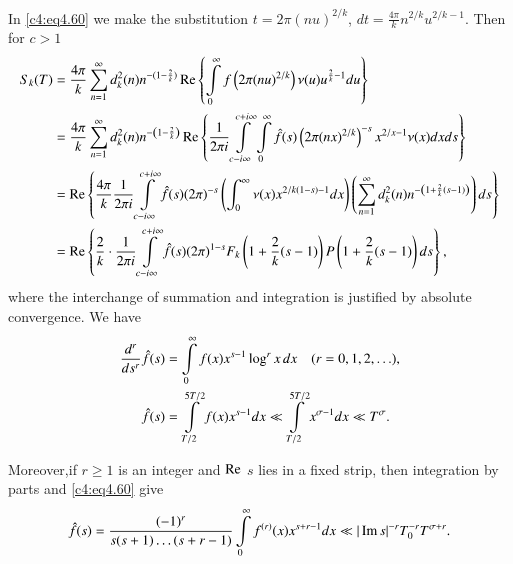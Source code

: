 In \eqref{c4:eq4.60} we make the substitution $t= 2 \pi (nu)^{2/k}$,
$dt = \frac{4\pi}{k} n ^{2/k}u^{2/k-1}$. Then for $c> 1$
{\fontsize{8}{10}\selectfont
\begin{align}
  S_k (T) & = \frac{4 \pi}{k} \sum_{n=1}^\infty d_k^2 (n) n^{- (1-
    \frac{2}{k})} \operatorname{Re} \left\{\int\limits_0^\infty f\left(2 \pi
  (nu)^{2/k}\right)\nu (u) u^{\frac{2}{k}-1} du \right\}\label{c4:eq4.62}\\
  & = \frac{4 \pi}{k} \sum_{n=1}^\infty d_k^2 (n) n^{- \left(1-
    \frac{2}{k}\right)} \operatorname{Re} \left\{\frac{1}{2 \pi i} \int\limits_{c- i
  \infty}^{c+ i \infty} \int\limits_0^\infty  \hat{f} (s) \left(2
  \pi(nx)^{2/k} \right)^{-s}  x^{2/x-1} \nu (x) dx ds\right\}\notag\\
  & = \operatorname{Re} \left\{\frac{4 \pi}{k} \frac{1}{2 \pi i} \int\limits_{c- i
    \infty}^{c+ i \infty} \hat{f} (s) (2 \pi)^{-s} \left(\int_0^\infty
  \nu (x) x^{2/k (1-s)-1}dx\right) \left(\sum_{n=1}^\infty d_k^2 (n)
  n^{- \left(1+ \frac{2}{k} (s-1) \right)} \right)ds \right\}\notag\\
  & = \operatorname{Re} \left\{\frac{2}{k} \cdot \frac{1}{2 \pi i} \int\limits_{c- i
  \infty}^{c+ i \infty} \hat{f} (s) (2 \pi)^{1-s} F_k \left(1+
  \frac{2}{k} (s-1) \right) P \left(1+ \frac{2}{k} (s-1) \right)ds
  \right\},\notag 
\end{align}}
where the interchange of summation  and integration is justified by
absolute convergence. We have
\begin{align}
  \frac{d^r}{ds^r} \hat{f} (s) & = \int\limits_0^\infty f(x) x^{s-1}
  \log^r x \,dx \quad (r= 0,1, 2, \ldots),\notag\\
  \hat{f} (s) & = \int\limits_{T/2}^{5T/2} f(x) x^{s-1} dx \ll
  \int\limits_{T/2}^{5T/2} x^{\sigma-1} dx \ll T^\sigma.\label{c4:eq4.63} 
\end{align}

Moreover,\pageoriginale if $r \geq 1$ is an integer and $\operatorname{Re}$ $s$ lies
in a fixed 
strip, then integration by parts and \eqref{c4:eq4.60} give
$$
\hat{f} (s) = \frac{(-1)^r}{s(s+1) \ldots (s+ r-1)}
\int\limits_0^\infty f^{(r)} (x) x^{s+r-1} dx \ll |\operatorname{Im} s|^{-r}
T_0^{-r} T^{\sigma+r}. 
$$

